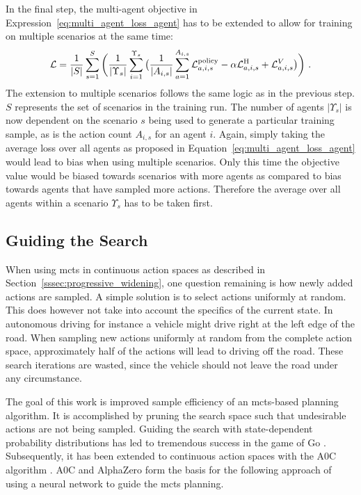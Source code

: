 In the final step, the multi-agent objective in Expression~\ref{eq:multi_agent_loss_agent} has to be extended to allow for training on multiple scenarios at the same time:
\begin{gather}\label{eq:multi_agent_full}
    \mathcal L = \frac{1}{|S|} \sum_{s=1}^{S} \bigg( \frac{1}{|\Upsilon_s|} \sum_{i=1}^{\Upsilon_s} \big( \frac{1}{|A_{i, s}|} \sum_{a=1}^{A_{i, s}} \mathcal L_{a, i, s}^{\text{policy}} - \alpha \mathcal L_{a, i, s}^{\text H} + \mathcal L_{a, i, s}^V \big) \bigg)~.
\end{gather}
The extension to multiple scenarios follows the same logic as in the previous step. $S$ represents the set of scenarios in the training run. The number of agents $| \Upsilon_s |$ is now dependent on the scenario $s$ being used to generate a particular training sample, as is the action count $A_{i, s}$ for an agent $i$. Again, simply taking the average loss over all agents as proposed in Equation~\ref{eq:multi_agent_loss_agent} would lead to bias when using multiple scenarios. Only this time the objective value would be biased towards scenarios with more agents as compared to bias towards agents that have sampled more actions. Therefore the average over all agents within a scenario $\Upsilon_s$ has to be taken first.


\subsection{Guiding the Search}\label{ssec:guided_search}
When using \gls{mcts} in continuous action spaces as described in Section~\ref{sssec:progressive_widening}, one question remaining is how newly added actions are sampled. A simple solution is to select actions uniformly at random. This does however not take into account the specifics of the current state. In autonomous driving for instance a vehicle might drive right at the left edge of the road. When sampling new actions uniformly at random from the complete action space, approximately half of the actions will lead to driving off the road. These search iterations are wasted, since the vehicle should not leave the road under any circumstance.

The goal of this work is improved sample efficiency of an \gls{mcts}-based planning algorithm. It is accomplished by pruning the search space such that undesirable actions are not being sampled. Guiding the search with state-dependent probability distributions has led to tremendous success in the game of Go \cite{silverMasteringGameGo2016, silverMasteringGameGo2017, silverGeneralReinforcementLearning2018}. Subsequently, it has been extended to continuous action spaces with the A0C algorithm \cite{moerlandA0CAlphaZero2018}. A0C and AlphaZero form the basis for the following approach of using a neural network to guide the \gls{mcts} planning.

